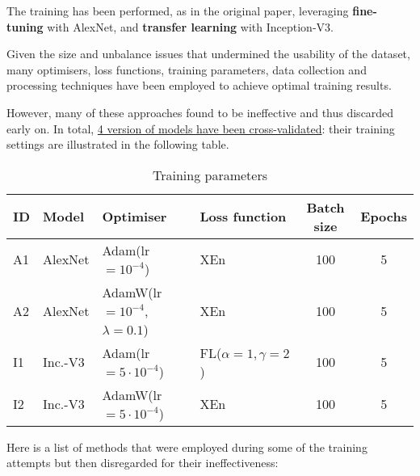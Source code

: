 The training has been performed, as in the original paper, leveraging \textbf{fine-tuning} with AlexNet, and \textbf{transfer learning} with Inception-V3.

Given the size and unbalance issues that undermined the usability of the dataset, many optimisers, loss functions, training parameters, data collection and processing techniques have been employed to achieve optimal training results.

However, many of these approaches found to be ineffective and thus discarded early on. In total, \uline{4 version of models have been cross-validated}: their training settings are illustrated in the following table.

\begin{table}[H]
\centering
\begin{tabular}{|l|l|l|l|c|c|}
\hline
ID & \textbf{Model} & \textbf{Optimiser} & \textbf{Loss function}  & \textbf{Batch size} & \textbf{Epochs} 
\\ \hline \hline
A1 & AlexNet & Adam(lr $= 10^{-4}$) & XEn & 100 & 5
\\ \hline
A2 & AlexNet & AdamW(lr $= 10^{-4}$, $\lambda = 0.1$) & XEn & 100 & 5
\\\hline 
I1 & Inc.-V3 & Adam(lr $ = 5\cdot10^{-4}$) & FL($\alpha=1, \gamma=2$) & 100 
& 5 
\\ \hline 
I2 & Inc.-V3 & AdamW(lr $ = 5\cdot10^{-4}$) & XEn & 100 & 5
\\ \hline
\end{tabular}
\caption{Training parameters}
\label{tab:training-parameters}
\end{table}

Here is a list of methods that were employed during some of the training attempts but then disregarded for their ineffectiveness:

